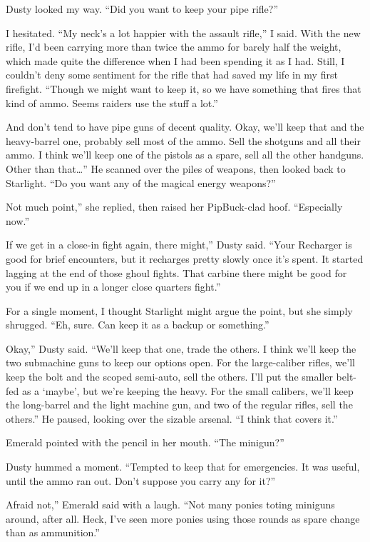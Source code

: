 Dusty looked my way. “Did you want to keep your pipe rifle?”

I hesitated. “My neck’s a lot happier with the assault rifle,” I said. With the new rifle, I’d been carrying more than twice the ammo for barely half the weight, which made quite the difference when I had been spending it as I had. Still, I couldn’t deny some sentiment for the rifle that had saved my life in my first firefight. “Though we might want to keep it, so we have something that fires that kind of ammo. Seems raiders use the stuff a lot.”

\leavevmode{}And don’t tend to have pipe guns of decent quality. Okay, we’ll keep that and the heavy-barrel one, probably sell most of the ammo. Sell the shotguns and all their ammo. I think we’ll keep one of the pistols as a spare, sell all the other handguns. Other than that…” He scanned over the piles of weapons, then looked back to Starlight. “Do you want any of the magical energy weapons?”

\leavevmode{}Not much point,” she replied, then raised her PipBuck-clad hoof. “Especially now.”

\leavevmode{}If we get in a close-in fight again, there might,” Dusty said. “Your Recharger is good for brief encounters, but it recharges pretty slowly once it’s spent. It started lagging at the end of those ghoul fights. That carbine there might be good for you if we end up in a longer close quarters fight.”

For a single moment, I thought Starlight might argue the point, but she simply shrugged. “Eh, sure. Can keep it as a backup or something.”

\leavevmode{}Okay,” Dusty said. “We’ll keep that one, trade the others. I think we’ll keep the two submachine guns to keep our options open. For the large-caliber rifles, we’ll keep the bolt and the scoped semi-auto, sell the others. I’ll put the smaller belt-fed as a ‘maybe’, but we’re keeping the heavy. For the small calibers, we’ll keep the long-barrel and the light machine gun, and two of the regular rifles, sell the others.” He paused, looking over the sizable arsenal. “I think that covers it.”

Emerald pointed with the pencil in her mouth. “The minigun?”

Dusty hummed a moment. “Tempted to keep that for emergencies. It was useful, until the ammo ran out. Don’t suppose you carry any for it?”

\leavevmode{}Afraid not,” Emerald said with a laugh. “Not many ponies toting miniguns around, after all. Heck, I’ve seen more ponies using those rounds as spare change than as ammunition.”

